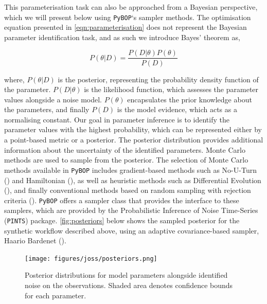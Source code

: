 \documentclass[
]{article}
\begin{document}
This parameterisation task can also be approached from a Bayesian
perspective, which we will present below using \texttt{PyBOP}`s sampler
methods. The optimisation equation presented in
\autoref{eqn:parameterisation} does not represent the Bayesian parameter
identification task, and as such we introduce Bayes' theorem as,

\begin{equation}
P(\theta|D) = \frac{P(D|\theta)P(\theta)}{P(D)}
\label{eqn:bayes_theorem}
\end{equation}

where, \(P(\theta|D)\) is the posterior, representing the probability
density function of the parameter. \(P(D|\theta)\) is the likelihood
function, which assesses the parameter values alongside a noise model.
\(P(\theta)\) encapsulates the prior knowledge about the parameters, and
finally \(P(D)\) is the model evidence, which acts as a normalising
constant. Our goal in parameter inference is to identify the parameter
values with the highest probability, which can be represented either by
a point-based metric or a posterior. The posterior distribution provides
additional information about the uncertainty of the identified
parameters. Monte Carlo methods are used to sample from the posterior.
The selection of Monte Carlo methods available in \texttt{PyBOP}
includes gradient-based methods such as No-U-Turn
() and Hamiltonian
(), as well as
heuristic methods such as Differential Evolution
(), and finally
conventional methods based on random sampling with rejection criteria
().
\texttt{PyBOP} offers a sampler class that provides the interface to
these samplers, which are provided by the Probabilistic Inference of
Noise Time-Series (\texttt{PINTS}) package. \autoref{fig:posteriors}
below shows the sampled posterior for the synthetic workflow described
above, using an adaptive covariance-based sampler, Haario Bardenet
().

\begin{figure}
\centering
\texttt{[image: figures/joss/posteriors.png]}
\caption{Posterior distributions for model parameters alongside
identified noise on the observations. Shaded area denotes confidence
bounds for each parameter. \label{fig:posteriors}}
\end{figure}
\end{document}
